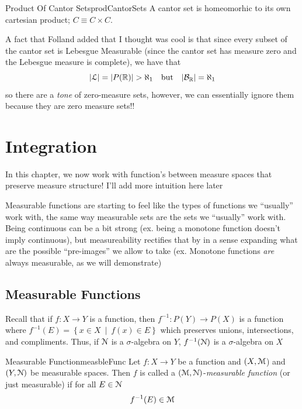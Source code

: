 \documentclass[oneside]{book}
\newcommand{\R}{\mathbb{R}}
\newcommand{\MM}{\EuScript{M}}
\newcommand{\EN}{\EuScript{N}}
\newcommand{\EL}{\EuScript{L}}
\newcommand{\BB}{\mathcal{B}}
\newcommand{\set}[2]{\left\{#1 \ \middle|\ #2\right\}}
\newcommand{\rw}{\rightarrow}
\begin{document}
\begin{cor}{Product Of Cantor Sets}{prodCantorSets}
	A cantor set is homeomorhic to its own cartesian product; $C\equiv C\times C$. 
\end{cor}

\begin{Proof}
	
\end{Proof}


A fact that Folland added that I thought was cool is that since every subset of the cantor set is Lebesgue Measurable
(since the cantor set has measure zero and the Lebesgue measure is complete), we have that 
\[
	|\EL| = |P(\R)| > \aleph_1\quad\text{but}\quad |\BB_\R| = \aleph_1
\]
so there are a \emph{tone} of zero-measure sets, however, we can essentially ignore them because they are zero measure
sets!!

\chapter{Integration}\label{cha:integration}

In this chapter, we now work with function's between measure spaces that preserve measure structure! I'll add more
intuition here later

Measurable functions are starting to feel like the types of functions we ``usually'' work with, the same way measurable
sets are the sets we ``usually'' work with. Being continuous can be a bit strong (ex. being a monotone function doesn't
imply continuous), but measureability rectifies that by in a sense expanding what are the possible ``pre-images'' we
allow to take (ex. Monotone functions \emph{are} always measurable, as we will demonstrate)

\section{Measurable Functions}

Recall that if $f: X \rw Y$ is a function, then $f^{-1}: P(Y) \rw P(X)$ is a function where $f^{-1}(E) = \set{x \in
X}{f(x) \in E}$ which preserves unions, intersections, and compliments. Thus, if $\EN$ is a $\sigma$-algebra on $Y$,
$f^{-1}(\EN)$ is a $\sigma$-algebra on $X$

\begin{defn}{Measurable Function}{measbleFunc}
	Let $f:X \rw Y$ be a function and $(X, \MM$) and $(Y, \EN)$ be measurable spaces. Then $f$ is called
	a $(\MM, \EN)$-\emph{measurable function} (or just measurable) if for all $E \in \EN$
	\[
		f^{-1}(E) \in \MM
	\]
\end{defn}
\end{document}
